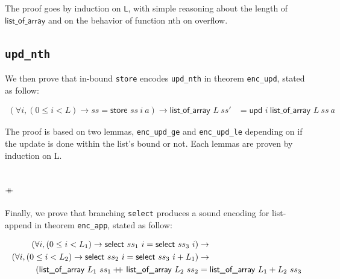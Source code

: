 \documentclass[onecolumn, preprint]{sigplanconf}
\newcommand{\select}[2]{\textsf{select } #1\ #2}
\newcommand{\store}[3]{\textsf{store } #1\ #2\ #3}
\newcommand{\loa}[2]{\textsf{list\_of\_array } #1\ #2}
\newcommand{\unth}[3]{\textsf{upd } #1\ #2\ #3}
\newcommand{\codeinl}[1]{\texttt{#1}}
\newcommand\doubleplus{+\kern-1.3ex+\kern0.8ex}
\begin{document}
The proof goes by induction on \codeinl{L}, with simple reasoning about the length of $\textsf{list\_of\_array}$ and on the behavior of function \textsf{nth} on overflow.

\subsection{\texttt{upd\_nth}}
We then prove that in-bound \texttt{store} encodes \texttt{upd\_nth} in theorem \texttt{enc\_upd}, stated as follow:

\begin{align*}
  (\forall i, (0 \leq i < L) \to ss = \store{ss}{i}{a}) \to 
     \loa{L}{ss'} &= \unth{i}{\loa{L}{ss}}{a}
\end{align*}

The proof is based on two lemmas, \texttt{enc\_upd\_ge} and \texttt{enc\_upd\_le} depending on if the update is done within the list's bound or not. Each lemmas are proven by induction on L.

\subsection{$\doubleplus$}
Finally, we prove that branching \codeinl{select} produces a sound encoding for list-append in theorem \texttt{enc\_app}, stated as follow:

\begin{align*}
(\forall i, (0 \leq i < L_1) \to \select{ss_1}{i} = \select{ss_3}{i}) &\to \\
  (\forall i, (0 \leq i < L_2) \to \select{ss_2}{i} = \select{ss_3}{i + L_1}) &\to  \\
  (\loa{L_1}{ss_1} \doubleplus \loa{L_2}{ss_2} &= \loa{L_1 + L_2}{ss_3}
\end{align*}
\end{document}
